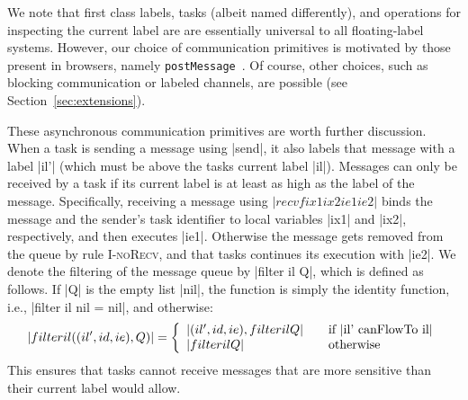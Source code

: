 We note that first class labels, tasks (albeit named differently), and
operations for inspecting the current label are are essentially universal to
all floating-label systems.
%
However, our choice of communication primitives is motivated by
those present in browsers, namely \texttt{postMessage}~\cite{webmessaging}.
%
Of course, other choices, such as blocking communication or labeled channels,
are possible (see Section~\ref{sec:extensions}).
%

These asynchronous communication primitives are worth further
discussion.  When a task is sending a message using |send|, it also labels that
message with a label |il'| (which must be above the tasks current label |il|).
Messages can only be received by a task if its current label is
at least as high as the label of the message.
Specifically, receiving a message using
$|recvf ix1 ix2 ie1 ie2|$
binds the message and the sender's task identifier
to local variables |ix1| and |ix2|, respectively, and then executes |ie1|.
Otherwise the message gets removed from the queue by rule \textsc{I-noRecv},
and that tasks continues its execution with |ie2|.
We denote the filtering of the message queue by |filter il Q|,
which is defined as follows.
If |Q| is the empty list |nil|, the
function is simply the identity function, i.e.,
|filter il nil = nil|, and otherwise:
\[
|filter il ((il', id, ie) , Q )| = \left\{
\begin{array}{l l}
|(il', id, ie) , filter il Q| & \quad \text{if |il' canFlowTo il|}\\
|filter il Q| & \quad \text{otherwise}
\end{array} \right.
\]
This ensures that tasks cannot receive messages that are more sensitive
than their current label would allow.

